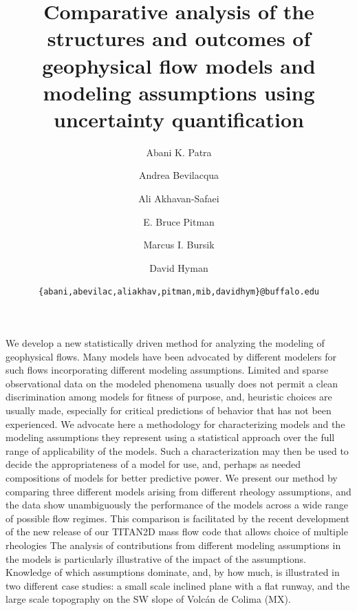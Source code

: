 \documentclass{article}
\begin{document}
\title{\bf Comparative analysis of the structures and outcomes of geophysical flow models and modeling assumptions using uncertainty quantification}
\author[1,3]{Abani K. Patra}
\author[2]{Andrea Bevilacqua}
\author[1]{Ali Akhavan-Safaei}
\author[4]{E. Bruce Pitman}
\author[2]{Marcus I. Bursik}
\author[2]{David Hyman}


\date{\texttt{\{abani,abevilac,aliakhav,pitman,mib,davidhym\}@buffalo.edu}}


\maketitle

\abstract

We develop a new statistically driven method for analyzing the modeling of geophysical flows. Many models have been advocated by different modelers for such flows incorporating different modeling assumptions. Limited and sparse observational data on the modeled phenomena usually does not permit a clean discrimination among models for fitness of purpose, and, heuristic choices are usually made, especially for critical predictions of behavior that has not been experienced. We advocate here a methodology for characterizing models and the modeling assumptions they represent using a statistical approach over the full range of applicability of the models. Such a characterization may then be used to decide the appropriateness of a model for use, and, perhaps as needed  compositions of models for better predictive power. We present our method by comparing three different models arising from different rheology assumptions, and the data show unambiguously the performance of the models across a wide range of possible flow regimes. This comparison is facilitated by the recent development of the new release of our TITAN2D mass flow code that allows choice of multiple rheologies The analysis of contributions from different modeling  assumptions in the models is particularly illustrative of the impact of the assumptions. Knowledge of which assumptions dominate, and, by how much, is illustrated in two different case studies: a small scale inclined plane with a flat runway, and the large scale topography on the SW slope of Volc\'{a}n de Colima (MX).
\end{document}
